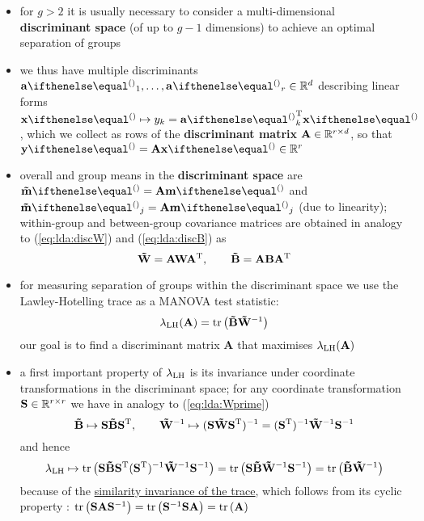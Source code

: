 \documentclass[a4paper]{article}
\begin{document}
\begin{itemize}
\item for $g > 2$ it is usually necessary to consider a multi-dimensional \textbf{discriminant space} (of up to $g - 1$ dimensions) to achieve an optimal separation of groups
\item we thus have multiple discriminants $\va_1, \ldots, \va_r\in \setR^d$ describing linear forms $\vx \mapsto y_k = \va_k\T\vx$, which we collect as rows of the \textbf{discriminant matrix} $\mathbf{A}\in \mathbb{R}^{r\times d}$, so that $\vy = \mathbf{A} \vx \in \setR^r$
\item overall and group means in the \textbf{discriminant space} are $\tvm = \mathbf{A} \vm$ and $\tvm_j = \mathbf{A} \vm_j$ (due to linearity); within-group and between-group covariance matrices are obtained in analogy to (\ref{eq:lda:discW}) and (\ref{eq:lda:discB}) as
  \begin{equation}
    \label{eq:lda:tildeWB}
    \mathbf{\tilde{W}} = \mathbf{A} \mathbf{W} \mathbf{A}^{\text{T}}, \qquad
    \mathbf{\tilde{B}} = \mathbf{A} \mathbf{B} \mathbf{A}^{\text{T}}
  \end{equation}
\item for measuring separation of groups within the discriminant space we use the Lawley-Hotelling trace as a MANOVA test statistic:
  \begin{equation}
    \label{eq:lda:LH}
    \lambda_{\text{LH}}(\mathbf{A}) = \mathop{\text{tr}}\left(\mathbf{\tilde{B}} \mathbf{\tilde{W}}^{-1}\right)
  \end{equation}
   our goal is to find a discriminant matrix $\mathbf{A}$ that maximises $\lambda_{\text{LH}}(\mathbf{A})$
 \item a first important property of $\lambda_{\text{LH}}$ is its invariance under coordinate transformations in the discriminant space; for any coordinate transformation $\mathbf{S}\in \mathbb{R}^{r\times r}$ we have in analogy to (\ref{eq:lda:Wprime})
   \begin{equation}
     \label{eq:lda:tildeWBtransform}
     \mathbf{\tilde{B}}\mapsto \mathbf{S} \mathbf{\tilde{B}} \mathbf{S}^{\text{T}},\qquad
     \mathbf{\tilde{W}}^{-1} \mapsto (\mathbf{S} \mathbf{\tilde{W}} \mathbf{S}^{\text{T}})^{-1}
     = (\mathbf{S}^{\text{T}})^{-1} \mathbf{\tilde{W}}^{-1} \mathbf{S}^{-1}
   \end{equation}
   and hence
   \begin{equation}
     \label{eq:lda:LHtransform}
     \lambda_{\text{LH}} \mapsto \mathop{\text{tr}}\left( \mathbf{S} \mathbf{\tilde{B}} \mathbf{S}^{\text{T}} (\mathbf{S}^{\text{T}})^{-1} \mathbf{\tilde{W}}^{-1} \mathbf{S}^{-1} \right)
     = \mathop{\text{tr}}\left( \mathbf{S} \mathbf{\tilde{B}} \mathbf{\tilde{W}}^{-1} \mathbf{S}^{-1} \right)
     = \mathop{\text{tr}}\left(\mathbf{\tilde{B}} \mathbf{\tilde{W}}^{-1}\right)
   \end{equation}
   because of the \href{https://en.wikipedia.org/wiki/Trace_(linear_algebra)#Trace_of_a_product}{similarity invariance of the trace}, which follows from its cyclic property \citep[696, C.9]{Bishop:06}: $\mathop{\text{tr}}\left(\mathbf{S} \mathbf{A} \mathbf{S}^{-1}\right) = \mathop{\text{tr}}\left(\mathbf{S}^{-1} \mathbf{S} \mathbf{A}\right) = \mathop{\text{tr}}\left(\mathbf{A}\right)$ \citep[88]{Deisenroth:Faisal:Ong:20}

\end{itemize}
\end{document}
